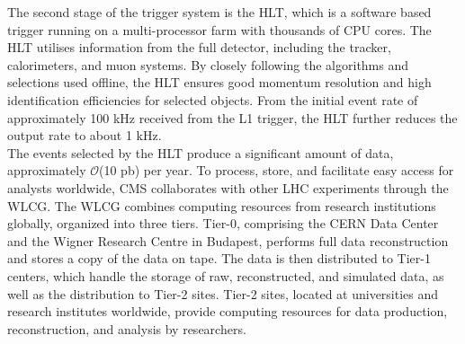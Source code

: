 The second stage of the trigger system is the \ac{HLT}, which is a software based trigger running on a multi-processor farm with thousands of CPU cores. 
The \ac{HLT} utilises information from the full detector, including the tracker, calorimeters, and muon systems. 
By closely following the algorithms and selections used offline, the \ac{HLT} ensures good momentum resolution and high identification efficiencies for selected objects. 
From the initial event rate of approximately 100 kHz received from the \ac{L1} trigger, the \ac{HLT} further reduces the output rate to about 1 kHz. \\

The events selected by the \ac{HLT} produce a significant amount of data, approximately $\mathcal{O}$(10 pb) per year. 
To process, store, and facilitate easy access for analysts worldwide, \ac{CMS} collaborates with other \ac{LHC} experiments through the \ac{WLCG}. 
The \ac{WLCG} combines computing resources from research institutions globally, organized into three tiers. 
Tier-0, comprising the CERN Data Center and the Wigner Research Centre in Budapest, performs full data reconstruction and stores a copy of the data on tape. 
The data is then distributed to Tier-1 centers, which handle the storage of raw, reconstructed, and simulated data, as well as the distribution to Tier-2 sites. 
Tier-2 sites, located at universities and research institutes worldwide, provide computing resources for data production, reconstruction, and analysis by researchers.

